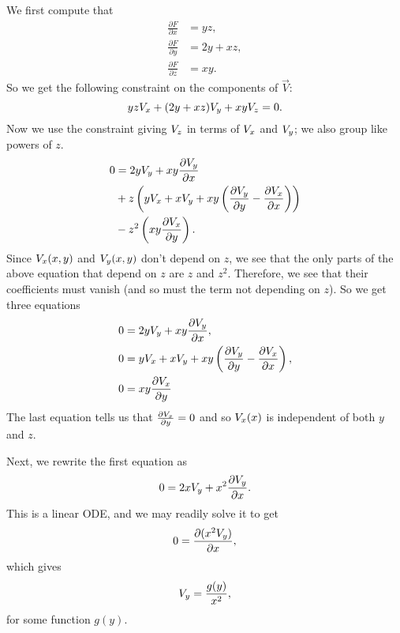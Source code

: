We first compute that
\begin{align}
\frac{\partial F}{\partial x} & = yz, \\
\frac{\partial F}{\partial y} & = 2y + xz, \\
\frac{\partial F}{\partial z} & = xy.
\end{align}
So we get the following constraint on the components of \(\vec V\):
\begin{equation}
yzV_x + (2y + xz)V_y + xy V_z = 0.
\end{equation}
Now we use the constraint giving \(V_z\) in terms of \(V_x\) and \(V_y\); we also group like powers of \(z\).
\begin{align}
0 & = 2yV_y + xy \frac{\partial V_y}{\partial x} \\
& + z \left( yV_x + x V_y + xy \left( \frac{\partial V_y}{\partial y} 
            - \frac{\partial V_x}{\partial x} \right)\right) \\
& - z^2 \left(xy \frac{\partial V_x}{\partial y}\right).
\end{align}
Since \(V_x(x,y)\) and \(V_y(x,y)\) don't depend on \(z\), we see that the only parts of the above equation
that depend on \(z\) are \(z\) and \(z^2\). Therefore, we see that their coefficients must vanish (and so must
the term not depending on \(z\)). So we get three equations
\begin{align}
0 & = 2yV_y + xy \frac{\partial V_y}{\partial x}, \\ 
0 & = yV_x + x V_y + xy \left( \frac{\partial V_y}{\partial y} 
            - \frac{\partial V_x}{\partial x} \right), \\
0 & = xy \frac{\partial V_x}{\partial y}
\end{align}
The last equation tells us that \(\frac{\partial V_x}{\partial y} = 0\) and so \(V_x(x)\) is independent of both
\(y\) and \(z\).

Next, we rewrite the first equation as 
\begin{equation}
0 = 2xV_y + x^2 \frac{\partial V_y}{\partial x}.
\end{equation}
This is a linear ODE, and we may readily solve it to get
\begin{equation}
0 = \frac{\partial (x^2V_y)} {\partial x},
\end{equation}
which gives
\begin{equation}
V_y = \frac{g(y)}{x^2}, 
\end{equation}
for some function \(g(y)\).
